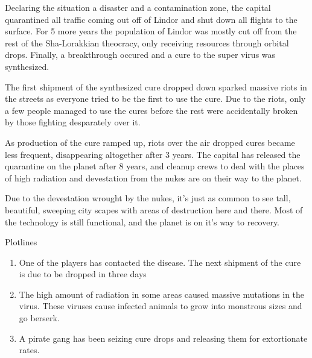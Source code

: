 Declaring the situation a disaster and a contamination zone, the capital
quarantined all traffic coming out off of Lindor and shut down all flights to
the surface. For 5 more years the population of Lindor was mostly cut off from
the rest of the Sha-Lorakkian theocracy, only receiving resources through
orbital drops. Finally, a breakthrough occured and a cure to the super virus
was synthesized.

The first shipment of the synthesized cure dropped down sparked massive riots in
the streets as everyone tried to be the first to use the cure. Due to the riots,
only a few people managed to use the cures before the rest were accidentally
broken by those fighting desparately over it.

As production of the cure ramped up, riots over the air dropped cures became
less frequent, disappearing altogether after 3 years. The capital has released
the quarantine on the planet after 8 years, and cleanup crews to deal with the
places of high radiation and devestation from the nukes are on their way to the
planet.

Due to the devestation wrought by the nukes, it's just as common to see tall,
beautiful, sweeping city scapes with areas of destruction here and there. Most
of the technology is still functional, and the planet is on it's way to
recovery.

Plotlines

\begin{enumerate}
    \item{One of the players has contacted the disease. The next shipment of
          the cure is due to be dropped in three days}
    \item{The high amount of radiation in some areas caused massive mutations
          in the virus. These viruses cause infected animals to grow into
          monstrous sizes and go berserk.}
    \item{A pirate gang has been seizing cure drops and releasing them for
          extortionate rates.}
\end{enumerate}
